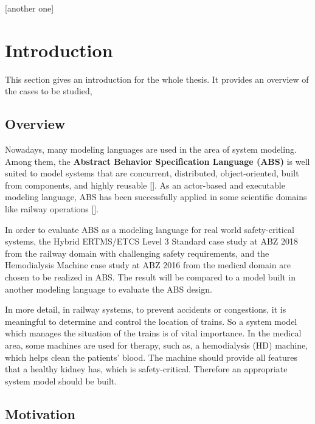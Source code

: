 \documentclass[article,dr=phil,type=drfinal,colorback,accentcolor=tud9c]{tudthesis}
\begin{document}
  {}
  \author{Chunyuan Yu}
  [another one]
  \makethesistitle
  
  \section{Introduction}
  
  This section gives an introduction for the whole thesis. It provides an overview of the cases to be studied, 
  
  \subsection{Overview}
  
  Nowadays, many modeling languages are used in the area of system modeling. Among them, the \textbf{Abstract Behavior Specification Language (ABS)} is well suited to model systems that are concurrent, distributed, object-oriented, built from components, and highly reusable []. As an actor-based and executable modeling language, ABS has been successfully applied in some scientific domains like railway operations [].
  
  In order to evaluate ABS as a modeling language for real world safety-critical systems, the Hybrid ERTMS/ETCS Level 3 Standard case study at ABZ 2018 from the railway domain with challenging safety requirements, and the Hemodialysis Machine case study at ABZ 2016 from the medical domain are chosen to be realized in ABS. The result will be compared to a model built in another modeling language to evaluate the ABS design.
  
  In more detail, in railway systems, to prevent accidents or congestions, it is meaningful to determine and control the location of trains. So a system model which manages the situation of the trains is of vital importance. In the medical area, some machines are used for therapy, such as, a hemodialysis (HD) machine, which helps clean the patients' blood. The machine should provide all features that a healthy kidney has, which is safety-critical. Therefore an appropriate system model should be built.
  
  \subsection{Motivation}
  
\end{document}
